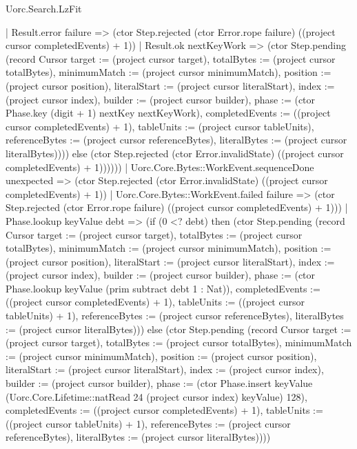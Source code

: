 \begin{lexlean}{Uorc.Search.LzFit}
\begin{semanticmodule}
{            | Result.error failure => (ctor Step.rejected (ctor Error.rope failure) ((project cursor completedEvents) + 1))
            | Result.ok nextKeyWork => (ctor Step.pending (record Cursor {target := (project cursor target), totalBytes := (project cursor totalBytes), minimumMatch := (project cursor minimumMatch), position := (project cursor position), literalStart := (project cursor literalStart), index := (project cursor index), builder := (project cursor builder), phase := (ctor Phase.key (digit + 1) nextKey nextKeyWork), completedEvents := ((project cursor completedEvents) + 1), tableUnits := (project cursor tableUnits), referenceBytes := (project cursor referenceBytes), literalBytes := (project cursor literalBytes)}))) else (ctor Step.rejected (ctor Error.invalidState) ((project cursor completedEvents) + 1))))))
      | Uorc.Core.Bytes::WorkEvent.sequenceDone unexpected => (ctor Step.rejected (ctor Error.invalidState) ((project cursor completedEvents) + 1))
      | Uorc.Core.Bytes::WorkEvent.failed failure => (ctor Step.rejected (ctor Error.rope failure) ((project cursor completedEvents) + 1)))
    | Phase.lookup keyValue debt => (if (0 <? debt) then (ctor Step.pending (record Cursor {target := (project cursor target), totalBytes := (project cursor totalBytes), minimumMatch := (project cursor minimumMatch), position := (project cursor position), literalStart := (project cursor literalStart), index := (project cursor index), builder := (project cursor builder), phase := (ctor Phase.lookup keyValue (prim subtract debt 1 : Nat)), completedEvents := ((project cursor completedEvents) + 1), tableUnits := ((project cursor tableUnits) + 1), referenceBytes := (project cursor referenceBytes), literalBytes := (project cursor literalBytes)})) else (ctor Step.pending (record Cursor {target := (project cursor target), totalBytes := (project cursor totalBytes), minimumMatch := (project cursor minimumMatch), position := (project cursor position), literalStart := (project cursor literalStart), index := (project cursor index), builder := (project cursor builder), phase := (ctor Phase.insert keyValue (Uorc.Core.Lifetime::natRead 24 (project cursor index) keyValue) 128), completedEvents := ((project cursor completedEvents) + 1), tableUnits := ((project cursor tableUnits) + 1), referenceBytes := (project cursor referenceBytes), literalBytes := (project cursor literalBytes)})))
}
\end{semanticmodule}
\end{lexlean}
